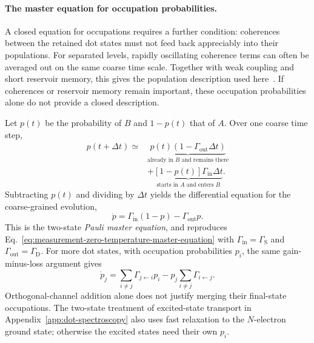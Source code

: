 \paragraph{The master equation for occupation probabilities.}
A closed equation for occupations requires a further condition:
coherences between the retained dot states must not feed back
appreciably into their populations. For separated levels, rapidly
oscillating coherence terms can often be averaged out on the
same coarse time scale. Together with weak coupling and short
reservoir memory, this gives the population description used
here~\cite{Schaller2020Notes}. If coherences or reservoir memory
remain important, these occupation probabilities alone do not
provide a closed description.

Let $p(t)$ be the probability of $B$ and $1-p(t)$ that of $A$.
Over one coarse time step,
\begin{equation}
 \begin{aligned}
 p(t+\Delta t)\simeq{}&
 \underbrace{p(t)(1-\Gamma_{\mathrm{out}}\Delta t)}_
             {\text{already in }B\text{ and remains there}}\\
 &+\underbrace{[1-p(t)]\Gamma_{\mathrm{in}}\Delta t}_
             {\text{starts in }A\text{ and enters }B}.
 \end{aligned}
 \label{eq:rates-probability-step}
\end{equation}
Subtracting $p(t)$ and dividing by $\Delta t$ yields the differential
equation for the coarse-grained evolution,
\begin{equation}
 \dot p=\Gamma_{\mathrm{in}}(1-p)-\Gamma_{\mathrm{out}}p.
 \label{eq:rates-two-state-master-equation}
\end{equation}
This is the two-state \emph{Pauli master equation}, and reproduces
Eq.~\eqref{eq:measurement-zero-temperature-master-equation} with
$\Gamma_{\mathrm{in}}=\Gamma_{\mathrm S}$ and
$\Gamma_{\mathrm{out}}=\Gamma_{\mathrm D}$.
For more dot states, with occupation probabilities $p_i$,
the same gain-minus-loss argument gives
\begin{equation}
 \dot p_j=\sum_{i\ne j}\Gamma_{j\leftarrow i}p_i
           -p_j\sum_{i\ne j}\Gamma_{i\leftarrow j}.
 \label{eq:rates-general-master-equation}
\end{equation}
Orthogonal-channel addition alone does not justify merging their
final-state occupations. The two-state treatment of excited-state
transport in Appendix~\ref{app:dot-spectroscopy} also
uses fast relaxation to the $N$-electron ground state; otherwise
the excited states need their own $p_i$.

